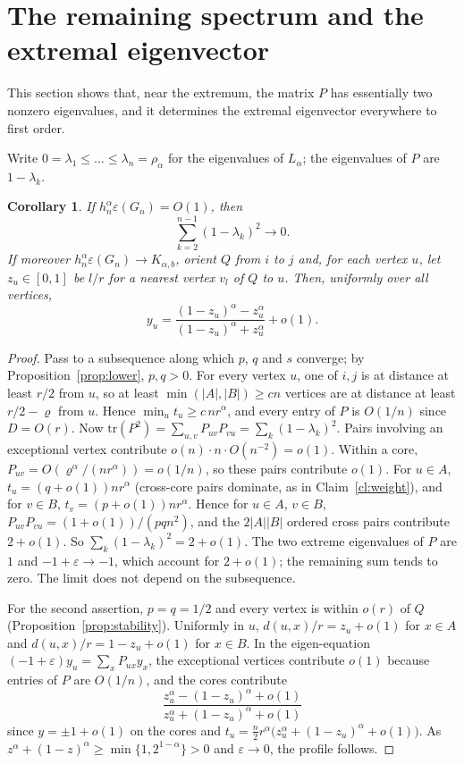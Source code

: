 \documentclass[11pt,a4paper]{article}
\newtheorem{corollary}[theorem]{Corollary}
\theoremstyle{definition}
\newcommand{\eps}{\varepsilon}
\begin{document}
\section{The remaining spectrum and the extremal eigenvector}\label{sec:spectrum}
This section shows that, near the extremum, the matrix $P$ has essentially two nonzero eigenvalues, and it determines the extremal eigenvector everywhere to first order.

Write $0=\lambda_1\le\dots\le\lambda_n=\rho_\alpha$ for the eigenvalues of $L_\alpha$; the eigenvalues of $P$ are $1-\lambda_k$.

\begin{corollary}\label{cor:spectrum}
If $h_n^\alpha\eps(G_n)=O(1)$, then
\[
 \sum_{k=2}^{n-1}(1-\lambda_k)^2\longrightarrow0.
\]
If moreover $h_n^\alpha\eps(G_n)\to K_{\alpha,b}$, orient $Q$ from $i$ to $j$ and, for each vertex $u$, let $z_u\in[0,1]$ be $l/r$ for a nearest vertex $v_l$ of $Q$ to $u$. Then, uniformly over all vertices,
\[
 y_u=\frac{(1-z_u)^\alpha-z_u^\alpha}{(1-z_u)^\alpha+z_u^\alpha}+o(1).
\]
\end{corollary}
\begin{proof}
Pass to a subsequence along which $p$, $q$ and $s$ converge; by Proposition~\ref{prop:lower}, $p,q>0$. For every vertex $u$, one of $i,j$ is at distance at least $r/2$ from $u$, so at least $\min(|A|,|B|)\ge cn$ vertices are at distance at least $r/2-\varrho$ from $u$. Hence $\min_ut_u\ge c\,nr^\alpha$, and every entry of $P$ is $O(1/n)$ since $D=O(r)$. Now $\mathrm{tr}(P^2)=\sum_{u,v}P_{uv}P_{vu}=\sum_k(1-\lambda_k)^2$. Pairs involving an exceptional vertex contribute $o(n)\cdot n\cdot O(n^{-2})=o(1)$. Within a core, $P_{uv}=O(\varrho^\alpha/(nr^\alpha))=o(1/n)$, so these pairs contribute $o(1)$. For $u\in A$, $t_u=(q+o(1))nr^\alpha$ (cross-core pairs dominate, as in Claim~\ref{cl:weight}), and for $v\in B$, $t_v=(p+o(1))nr^\alpha$. Hence for $u\in A$, $v\in B$, $P_{uv}P_{vu}=(1+o(1))/(pqn^2)$, and the $2|A||B|$ ordered cross pairs contribute $2+o(1)$. So $\sum_k(1-\lambda_k)^2=2+o(1)$. The two extreme eigenvalues of $P$ are $1$ and $-1+\eps\to-1$, which account for $2+o(1)$; the remaining sum tends to zero. The limit does not depend on the subsequence.

For the second assertion, $p=q=1/2$ and every vertex is within $o(r)$ of $Q$ (Proposition~\ref{prop:stability}). Uniformly in $u$, $d(u,x)/r=z_u+o(1)$ for $x\in A$ and $d(u,x)/r=1-z_u+o(1)$ for $x\in B$. In the eigen-equation $(-1+\eps)y_u=\sum_xP_{ux}y_x$, the exceptional vertices contribute $o(1)$ because entries of $P$ are $O(1/n)$, and the cores contribute
\[
 \frac{z_u^\alpha-(1-z_u)^\alpha+o(1)}{z_u^\alpha+(1-z_u)^\alpha+o(1)}
\]
since $y=\pm1+o(1)$ on the cores and $t_u=\frac n2r^\alpha\big(z_u^\alpha+(1-z_u)^\alpha+o(1)\big)$. As $z^\alpha+(1-z)^\alpha\ge\min\{1,2^{1-\alpha}\}>0$ and $\eps\to0$, the profile follows.
\end{proof}
\end{document}
